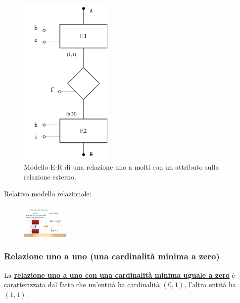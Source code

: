 \documentclass[a4paper]{article}
\begin{document}
	\begin{figure}[!htp]
		\centering
		\includegraphics[width=0.4\textwidth]{img/relazionale_uno_a_molti_att_relazione.pdf}
		\caption{Modello E-R di una relazione uno a molti con un attributo sulla relazione esterno.}
	\end{figure}
	
	\noindent
	Relativo modello relazionale:
	
	\begin{figure}[!htp]
		\centering
		\includegraphics[width=0.2\textwidth]{img/relazionale_uno_a_molti_att_relazione2.pdf}
	\end{figure}

	\newpage
	
	\subsubsection{Relazione uno a uno (una cardinalità minima a zero)}
	
	La \textcolor{Red3}{\textbf{\underline{relazione uno a uno con una cardinalità minima uguale a zero}}} è caratterizzata dal fatto che un'entità ha cardinalità $\left(0,1\right)$, l'altra entità ha $\left(1,1\right)$.
	
\end{document}
